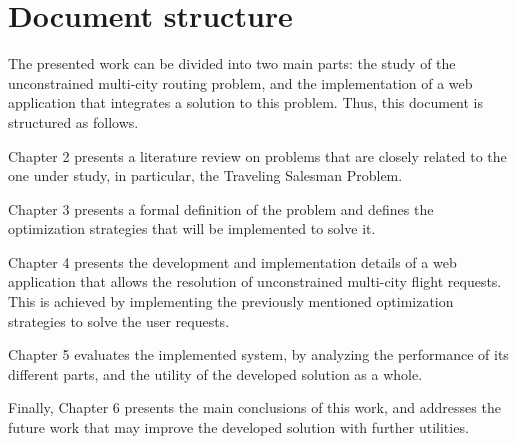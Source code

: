 \section{Document structure}

The presented work can be divided into two main parts: the study of the unconstrained multi-city routing problem, and the implementation of a web application that integrates a solution to this problem. Thus, this document is structured as follows.

Chapter 2 presents a literature review on problems that are closely related to the one under study, in particular, the Traveling Salesman Problem.

Chapter 3 presents a formal definition of the problem and defines the optimization strategies that will be implemented to solve it.

Chapter 4 presents the development and implementation details of a web application that allows the resolution of unconstrained multi-city flight requests. This is achieved by implementing the  previously mentioned optimization strategies to solve the user requests.  

Chapter 5 evaluates the implemented system, by analyzing the performance of its different parts, and the utility of the developed solution as a whole.

Finally, Chapter 6 presents the main conclusions of this work, and addresses the future work that may improve the developed solution with further utilities.

